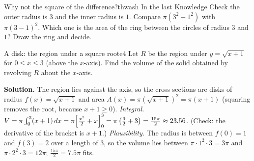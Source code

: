 \documentclass[11pt]{article}
\begin{document}
\begin{think}{Why not the square of the difference?}{thwash}
In the last Knowledge Check the outer radius is $3$ and the inner radius is $1$. Compare $\pi(3^2-1^2)$ with $\pi(3-1)^2$. Which one is the area of the ring between the circles of radius $3$ and $1$? Draw the ring and decide.
\end{think}

\begin{exmp}{A disk: the region under a square root}{e4}
Let $R$ be the region under $y=\sqrt{x+1}$ for $0\le x\le3$ (above the $x$-axis). Find the volume of the solid obtained by revolving $R$ about the $x$-axis.

\textbf{Solution.} The region lies against the axis, so the cross sections are disks of radius $f(x)=\sqrt{x+1}$ and area $A(x)=\pi\left(\sqrt{x+1}\right)^2=\pi(x+1)$ (squaring removes the root, because $x+1\ge0$).
\emph{Integral.} $V=\pi\int_0^3(x+1)\,dx=\pi\Bigl[\frac{x^2}2+x\Bigr]_0^3=\pi\left(\frac92+3\right)=\frac{15\pi}2\approx23.56$. (Check: the derivative of the bracket is $x+1$.)
\emph{Plausibility.} The radius is between $f(0)=1$ and $f(3)=2$ over a length of $3$, so the volume lies between $\pi\cdot1^2\cdot3=3\pi$ and $\pi\cdot2^2\cdot3=12\pi$; $\frac{15\pi}2=7.5\pi$ fits.


\end{exmp}
\end{document}
